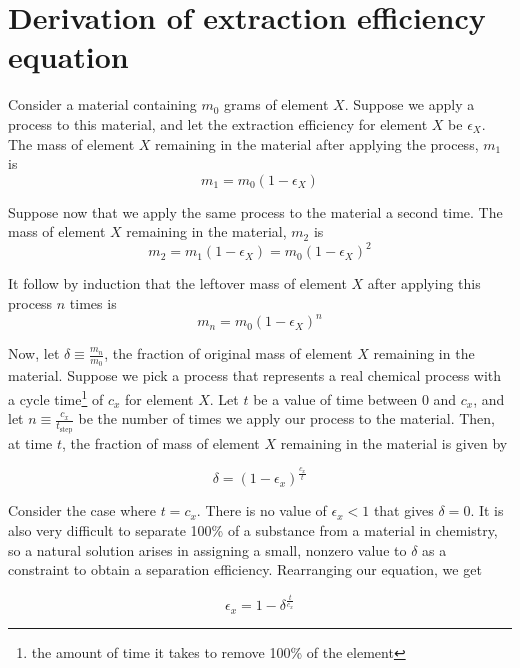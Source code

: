 \chapter{Derivation of extraction efficiency equation}
\label{appex:extraction-efficiency}

Consider a material containing $m_0$ grams of element $X$. Suppose we apply
a process to this material, and let the extraction efficiency for element $X$ be
$\epsilon_{X}$. The mass of element $X$ remaining in the material after applying
the process, $m_{1}$ is
\begin{equation}
   m_{1} = m_0(1-\epsilon_{X}) 
\end{equation}

Suppose now that we apply the same process to the material a second time. The mass of element $X$ remaining in the material, $m_{2}$ is 
\begin{equation}
    m_{2} = m_{1}(1-\epsilon_{X}) = m_0(1-\epsilon_{X})^{2}
\end{equation}

It follow by induction that the leftover mass of element $X$ after applying this
process $n$ times is
\begin{equation}
    m_{n} = m_0(1-\epsilon_{X})^{n}
\end{equation}

Now, let $\delta \equiv \frac{m_{n}}{m_0}$, the fraction of original mass of
element $X$ remaining in the material. Suppose we pick a process that represents
a real chemical process with a cycle time\footnote{the amount of time it takes
to remove 100\% of the element} of $c_{x}$ for element $X$. Let $t$ be a value
of time between 0 and $c_{x}$, and let $n \equiv \frac{c_{x}}{t_\text{step}}$ be
the number of times we apply our process to the material. Then, at time $t$, the
fraction of mass of element $X$ remaining in the material is given by

\begin{equation}
    \delta = (1-\epsilon_{x})^{\frac{c_{x}}{t}}
\end{equation}

Consider the case where $t=c_{x}$. There is no value of $\epsilon_{x} < 1$ that
gives $\delta = 0$. It is also very difficult to separate 100\% of a substance
from a material in chemistry, so a natural solution arises in assigning a small,
nonzero value to $\delta$ as a constraint to obtain a separation efficiency.
Rearranging our equation, we get

\begin{equation}
    \epsilon_{x} = 1 - \delta^{\frac{t}{c_{x}}}
\end{equation}

